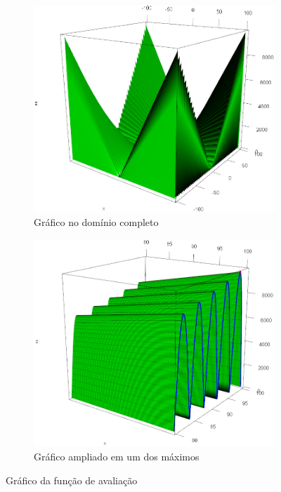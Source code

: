 
\begin{figure}[ht]
	\centering
	\begin{subfigure}[b]{0.47\linewidth}
		\includegraphics[width=\linewidth]{imagens/teste1.png}
		\caption{Gráfico no domínio completo}
	\end{subfigure}
	\begin{subfigure}[b]{0.47\linewidth}
		\includegraphics[width=\linewidth]{imagens/teste2.png}
		\caption{Gráfico ampliado em um dos máximos}
	\end{subfigure}
	\caption{Gráfico da função de avaliação}
	\label{fig:grafico_teste1}
\end{figure}

